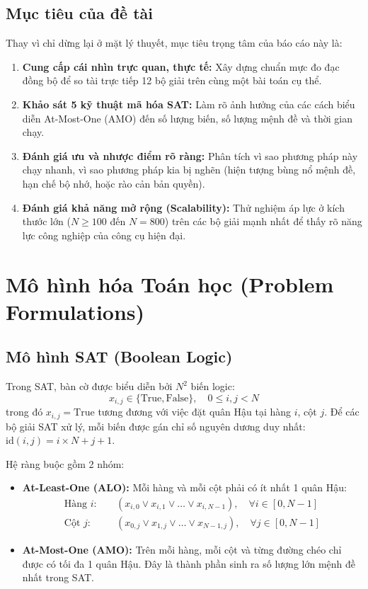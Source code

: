 \documentclass[a4paper,11pt]{article}
\begin{document}
\subsection{Mục tiêu của đề tài}
Thay vì chỉ dừng lại ở mặt lý thuyết, mục tiêu trọng tâm của báo cáo này là:
\begin{enumerate}
    \item \textbf{Cung cấp cái nhìn trực quan, thực tế:} Xây dựng chuẩn mực đo đạc đồng bộ để so tài trực tiếp 12 bộ giải trên cùng một bài toán cụ thể.
    \item \textbf{Khảo sát 5 kỹ thuật mã hóa SAT:} Làm rõ ảnh hưởng của các cách biểu diễn At-Most-One (AMO) đến số lượng biến, số lượng mệnh đề và thời gian chạy.
    \item \textbf{Đánh giá ưu và nhược điểm rõ ràng:} Phân tích vì sao phương pháp này chạy nhanh, vì sao phương pháp kia bị nghẽn (hiện tượng bùng nổ mệnh đề, hạn chế bộ nhớ, hoặc rào cản bản quyền).
    \item \textbf{Đánh giá khả năng mở rộng (Scalability):} Thử nghiệm áp lực ở kích thước lớn ($N \ge 100$ đến $N=800$) trên các bộ giải mạnh nhất để thấy rõ năng lực công nghiệp của công cụ hiện đại.
\end{enumerate}

\section{Mô hình hóa Toán học (Problem Formulations)}

\subsection{Mô hình SAT (Boolean Logic)}
Trong SAT, bàn cờ được biểu diễn bởi $N^2$ biến logic:
\begin{equation}
    x_{i,j} \in \{\text{True}, \text{False}\}, \quad 0 \le i, j < N
\end{equation}
trong đó $x_{i,j} = \text{True}$ tương đương với việc đặt quân Hậu tại hàng $i$, cột $j$. Để các bộ giải SAT xử lý, mỗi biến được gán chỉ số nguyên dương duy nhất: $\text{id}(i, j) = i \times N + j + 1$.

Hệ ràng buộc gồm 2 nhóm:
\begin{itemize}
    \item \textbf{At-Least-One (ALO):} Mỗi hàng và mỗi cột phải có ít nhất 1 quân Hậu:
    \begin{align}
        \text{Hàng } i: & \quad (x_{i,0} \lor x_{i,1} \lor \dots \lor x_{i,N-1}), \quad \forall i \in [0, N-1] \\
        \text{Cột } j: & \quad (x_{0,j} \lor x_{1,j} \lor \dots \lor x_{N-1,j}), \quad \forall j \in [0, N-1]
    \end{align}
    \item \textbf{At-Most-One (AMO):} Trên mỗi hàng, mỗi cột và từng đường chéo chỉ được có tối đa 1 quân Hậu. Đây là thành phần sinh ra số lượng lớn mệnh đề nhất trong SAT.
\end{itemize}
\end{document}
